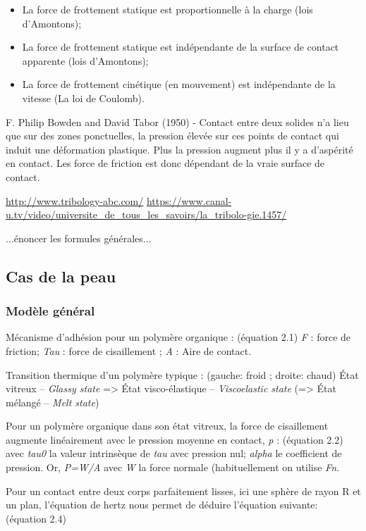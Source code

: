 \begin{itemize}
\item La force de frottement statique est proportionnelle à la charge (lois d’Amontons);
\item La force de frottement statique est indépendante de la surface de contact apparente (lois d’Amontons);
\item La force de frottement cinétique (en mouvement) est indépendante de la vitesse (La loi de Coulomb).
\end{itemize}

F. Philip Bowden and David Tabor (1950) - Contact entre deux solides n'a lieu que sur des zones ponctuelles, la pression élevée sur ces points de contact qui induit une déformation plastique. Plus la pression augment plus il y a d'aspérité en contact. Les force de friction est donc dépendant de la vraie surface de contact.

\url{http://www.tribology-abc.com/}
\url{https://www.canal-u.tv/video/universite_de_tous_les_savoirs/la_tribolo-gie.1457/}

...énoncer les formules générales...

\subsection{Cas de la peau}
\subsubsection{Modèle général}
Mécanisme d'adhésion pour un polymère organique :
(équation 2.1)
\textit{F} : force de friction; \textit{Tau} : force de cisaillement ; \textit{A} : Aire de contact.

Transition thermique d'un polymère typique : (gauche: froid ; droite: chaud)
État vitreux -- \textit{Glassy state} => État visco-élastique -- \textit{Viscoelastic state} (=> État mélangé -- \textit{Melt state}) 

Pour un polymère organique dans son état vitreux, la force de cisaillement augmente linéairement avec le pression moyenne en contact, \textit{p} :
(équation 2.2)
avec \textit{tau0} la valeur intrinsèque de \textit{tau} avec pression nul; \textit{alpha} le coefficient de pression.
Or, \textit{P=W/A}
avec \textit{W} la force normale (habituellement on utilise \textit{Fn}.
 
Pour un contact entre deux corps parfaitement lisses, ici une sphère de rayon R et un plan, l'équation de hertz nous permet de déduire l'équation suivante:
(équation 2.4)

